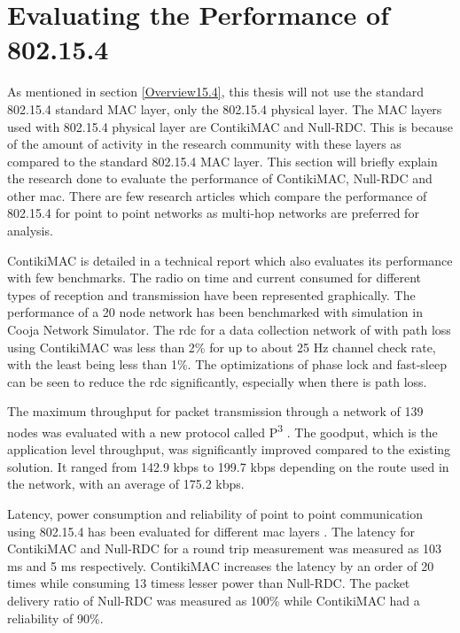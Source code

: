 \section{Evaluating the Performance of 802.15.4} \label{4802}

As mentioned in section \ref{Overview15.4}, this thesis will not use the standard 802.15.4 standard MAC layer, only the 802.15.4 physical layer. The MAC layers used with 802.15.4 physical layer are ContikiMAC and Null-RDC. This is because of the amount of activity in the research community with these layers as compared to the standard 802.15.4 MAC layer. This section will briefly explain the research done to evaluate the performance of ContikiMAC, Null-RDC and other \gls{mac}. There are few research articles which compare the performance of 802.15.4 for point to point networks as multi-hop networks are preferred for analysis.

ContikiMAC is detailed in a technical report  \cite{Dunkels2011} which also evaluates its performance with few benchmarks. The radio on time and current consumed for different types of reception and transmission have been represented graphically. The performance of a 20 node network has been benchmarked with simulation in Cooja Network Simulator. The \gls{rdc} for a data collection network of with path loss using ContikiMAC was less than 2\% for up to about 25 Hz channel check rate, with the least being less than 1\%. The optimizations of phase lock and fast-sleep can be seen to reduce the \gls{rdc} significantly, especially when there is path loss.

The maximum throughput for packet transmission through a  network of 139 nodes was evaluated with a new protocol called P\textsuperscript{3}  \cite{Doddavenkatappa2014}. The goodput, which is the application level throughput, was significantly improved compared to the existing solution. It ranged from 142.9 kbps to 199.7 kbps depending on the route used in the network, with an average of 175.2 kbps.

Latency, power consumption and reliability of point to point communication using 802.15.4 has been evaluated for different \gls{mac} layers \cite{Uwase2014}. The latency for ContikiMAC and Null-RDC for a round trip measurement was measured as 103 ms and 5 ms respectively. ContikiMAC increases the latency by an order of 20 times while consuming 13 timess lesser power than Null-RDC. The packet delivery ratio of Null-RDC was measured as 100\% while ContikiMAC had a reliability of 90\%.

